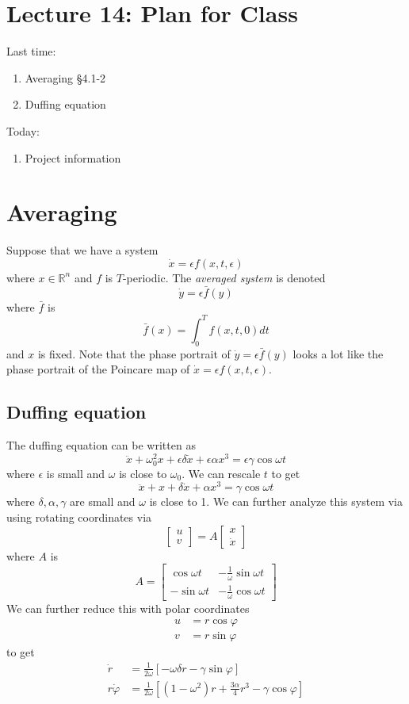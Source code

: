 \documentclass{article}
\begin{document}
\section{Lecture 14: Plan for Class}
Last time:
\begin{enumerate}
    \item Averaging \S 4.1-2
    \item Duffing equation
\end{enumerate}

Today:
\begin{enumerate}
    \item Project information
\end{enumerate}

\section{Averaging}
Suppose that we have a system 
\[
\dot{x} = \epsilon f(x,t,\epsilon)
\]
where $x\in\mathbb{R}^n$ and $f$ is $T$-periodic. The \textit{averaged system} is denoted 
\[
\dot{y}=\epsilon \bar{f}(y)
\]
where $\bar{f}$ is 
\[
\bar{f}(x)=\int^T_0 f(x,t,0)dt
\]
and $x$ is fixed. Note that the phase portrait of $\dot{y}=\epsilon \bar{f}(y)$ looks a lot like the phase portrait of the Poincare map of $\dot{x} = \epsilon f(x,t,\epsilon)$.

\subsection{Duffing equation}

The duffing equation can be written as 
\[
\ddot{x} + \omega_0^2 x + \epsilon \delta \dot{x} + \epsilon \alpha x^3 = \epsilon \gamma \cos \omega t
\]
where $\epsilon$ is small and $\omega$ is close to $\omega_0$. We can rescale $t$ to get 
\[
\ddot{x} + x + \delta \dot{x} + \alpha x^3 = \gamma \cos \omega t
\]
where $\delta,\alpha,\gamma$ are small and $\omega$ is close to 1. We can further analyze this system via using rotating coordinates via 
\[
\begin{bmatrix}
    u \\ v
\end{bmatrix} = A \begin{bmatrix}
    x \\ \dot{x}
\end{bmatrix}
\]
where $A$ is 
\[
A = \begin{bmatrix}
    \cos \omega t & -\frac{1}{\omega}\sin \omega t \\
    -\sin \omega t & -\frac{1}{\omega} \cos \omega t
\end{bmatrix}
\]
We can further reduce this with polar coordinates
\begin{align*}
    u &= r\cos \varphi \\
    v &= r\sin\varphi
\end{align*}
to get 
\begin{align*}
    \dot{r} &= \frac{1}{2\omega}\left[-\omega \delta r - \gamma \sin\varphi\right]\\
    r\dot{\varphi} &= \frac{1}{2\omega}\left[\left(1-\omega^2\right)r + \frac{3\alpha}{4}r^3-\gamma \cos\varphi \right]
\end{align*}
\end{document}
